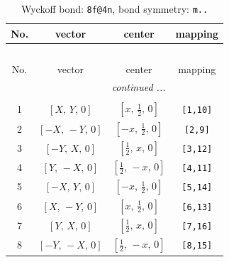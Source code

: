 \documentclass[fleqn,8pt]{jsarticle}
\begin{document}
\begin{longtable}{cccc}
\caption{Wyckoff bond: {\tt 8f@4n}, bond symmetry: {\tt m..}}
 \\
 \hline \hline
No. & vector & center & mapping \\ \hline \endfirsthead

\multicolumn{3}{l}{\tablename\ \thetable{}} \\
 \hline \hline
No. & vector & center & mapping \\ \hline \endhead

 \hline \hline
\multicolumn{3}{r}{\footnotesize\it continued ...} \\ \endfoot

 \hline \hline
\multicolumn{3}{r}{} \\ \endlastfoot

1 & $\left[ X,\, Y,\, 0 \right]$ & $\left[ x,\, \frac{1}{2},\, 0 \right]$ & {\tt [1,10]} \\ \hline
2 & $\left[ - X,\, - Y,\, 0 \right]$ & $\left[ - x,\, \frac{1}{2},\, 0 \right]$ & {\tt [2,9]} \\ \hline
3 & $\left[ - Y,\, X,\, 0 \right]$ & $\left[ \frac{1}{2},\, x,\, 0 \right]$ & {\tt [3,12]} \\ \hline
4 & $\left[ Y,\, - X,\, 0 \right]$ & $\left[ \frac{1}{2},\, - x,\, 0 \right]$ & {\tt [4,11]} \\ \hline
5 & $\left[ - X,\, Y,\, 0 \right]$ & $\left[ - x,\, \frac{1}{2},\, 0 \right]$ & {\tt [5,14]} \\ \hline
6 & $\left[ X,\, - Y,\, 0 \right]$ & $\left[ x,\, \frac{1}{2},\, 0 \right]$ & {\tt [6,13]} \\ \hline
7 & $\left[ Y,\, X,\, 0 \right]$ & $\left[ \frac{1}{2},\, x,\, 0 \right]$ & {\tt [7,16]} \\ \hline
8 & $\left[ - Y,\, - X,\, 0 \right]$ & $\left[ \frac{1}{2},\, - x,\, 0 \right]$ & {\tt [8,15]} \\
\end{longtable}
\renewcommand{\arraystretch}{1.2}
\end{document}
